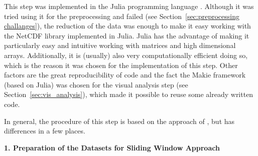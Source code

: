 This step was implemented in the Julia programming language \cite{bezanson_julia_2017}.
Although it was tried using it for the preprocessing and failed (see Section~\ref{sec:preprocessing challanges}), the reduction of the data was enough to make it easy working with  the NetCDF library  \cite{barth_ncdatasetsjl_2024} implemented in Julia. 
Julia has the advantage of making it particularly easy and intuitive working with matrices and high dimensional arrays. 
Additionally, it is (usually) also very computationally efficient doing so, which is the reason it was chosen for the implementation of this step. 
Other factors are the great reproducibility of code and the fact the Makie framework (based on Julia) was chosen for the visual analysis step (see Section~\ref{sec:vis_analysis}), which made it possible to reuse some already written code. 


In general, the procedure of this step is based on the approach of \cite{vietinghoff_visual_2021}, but has differences in a few places. 


\textbf{1. Preparation of the Datasets for Sliding Window Approach}

